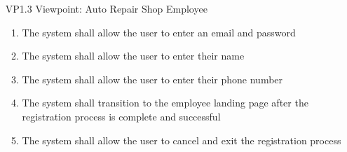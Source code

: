 \documentclass[12pt]{article}
\begin{document}
\begin{enumerate}
\begin{enumerate}
\begin{enumerate}
		            \end{enumerate}
	      \end{enumerate}
	      \begin{enumerate}
		      \item [{VP1}.3] Viewpoint: Auto Repair Shop Employee
		            \begin{enumerate}
			            \item The system shall allow the user to enter an email and password
			            \item The system shall allow the user to enter their name
			            \item The system shall allow the user to enter their phone number
			            \item The system shall transition to the employee landing page after the registration process is complete
			                  and successful
			            \item The system shall allow the user to cancel and exit the registration process
		            \end{enumerate}
	      \end{enumerate}
\end{enumerate}
\end{document}
